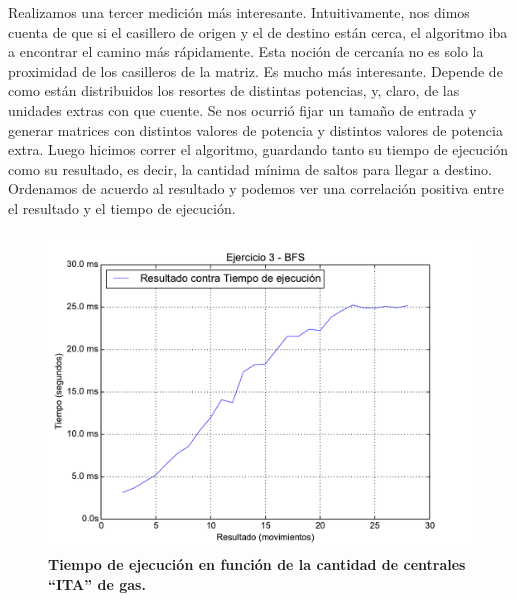 \documentclass[11pt, a4paper, twoside]{article}
\begin{document}

Realizamos una tercer medición más interesante. Intuitivamente, nos dimos cuenta de que si el casillero de origen y el de destino están cerca, el algoritmo iba a encontrar el camino más rápidamente. Esta noción de cercanía no es solo la proximidad de los casilleros de la matriz. Es mucho más interesante. Depende de como están distribuidos los resortes de distintas potencias, y, claro, de las unidades extras con que cuente. Se nos ocurrió fijar un tamaño de entrada y generar matrices con distintos valores de potencia y distintos valores de potencia extra. Luego hicimos correr el algoritmo, guardando tanto su tiempo de ejecución como su resultado, es decir, la cantidad mínima de saltos para llegar a destino. Ordenamos de acuerdo al resultado y podemos ver una correlación positiva entre el resultado y el tiempo de ejecución. 

\begin{figure}[H]
   \begin{center}
   \includegraphics[width=1.4\textwidth,angle=90]{../ej3/graficos/test_porTamanhoSalisa.pdf}
   \caption{\textbf{Tiempo de ejecución en función de la cantidad de centrales ``ITA'' de gas.}}
   \label{fig:ej3-graf-1}
   \end{center}
\end{figure}
\clearpage
\end{document}
